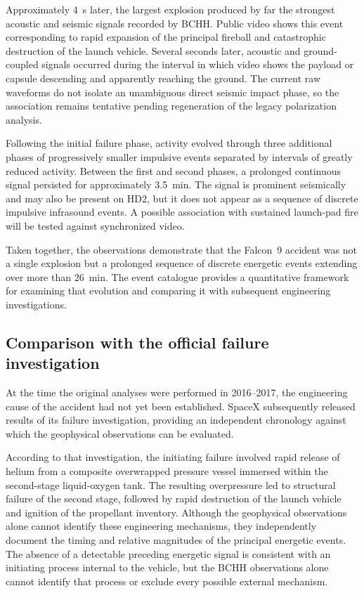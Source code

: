 \documentclass[]{seismica}
\begin{document}
Approximately 4~s later, the largest explosion produced by far the strongest acoustic and seismic signals recorded by BCHH. Public video shows this event corresponding to rapid expansion of the principal fireball and catastrophic destruction of the launch vehicle. Several seconds later, acoustic and ground-coupled signals occurred during
the interval in which video shows the payload or capsule descending and
apparently reaching the ground. The current raw waveforms do not isolate an
unambiguous direct seismic impact phase, so the association remains tentative
pending regeneration of the legacy polarization analysis.

Following the initial failure phase, activity evolved through three
additional phases of progressively smaller impulsive events separated by
intervals of greatly reduced activity. Between the first and second phases, a
prolonged continuous signal persisted for approximately 3.5~min. The signal is
prominent seismically and may also be present on HD2, but it does not appear as
a sequence of discrete impulsive infrasound events. A possible association with
sustained launch-pad fire will be tested against synchronized video.

Taken together, the observations demonstrate that the Falcon~9 accident was not a single explosion but a prolonged sequence of discrete energetic events extending over more than 26~min. The event catalogue provides a quantitative framework for examining that evolution and comparing it with subsequent engineering investigations.

\subsection{Comparison with the official failure investigation}
\label{sec:discussion_investigation}

At the time the original analyses were performed in 2016--2017, the engineering cause of the accident had not yet been established. SpaceX subsequently released results of its failure investigation, providing an independent chronology against which the geophysical observations can be evaluated.

According to that investigation, the initiating failure involved rapid release
of helium from a composite overwrapped pressure vessel immersed within the
second-stage liquid-oxygen tank. The resulting overpressure led to structural
failure of the second stage, followed by rapid destruction of the launch
vehicle and ignition of the propellant inventory. Although the geophysical
observations alone cannot identify these engineering mechanisms, they
independently document the timing and relative magnitudes of the principal
energetic events. The absence of a detectable preceding energetic signal is
consistent with an initiating process internal to the vehicle, but the BCHH
observations alone cannot identify that process or exclude every possible
external mechanism.
\end{document}

